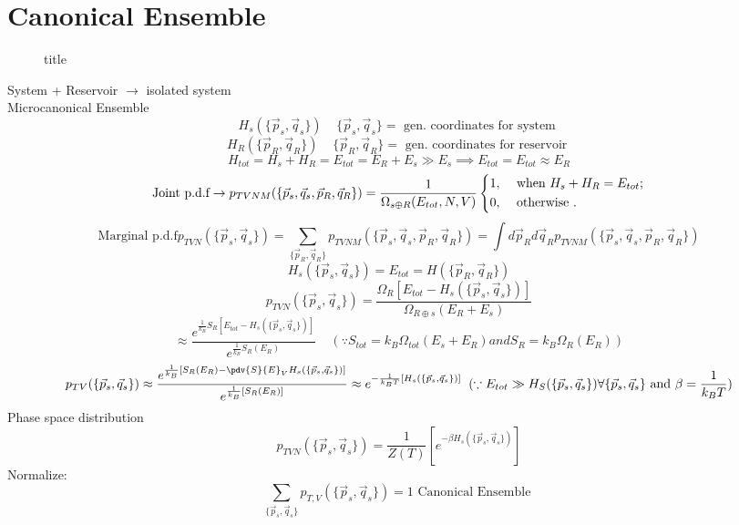 \chapter{Canonical Ensemble}
\begin{figure}[H]
    \centering
    \caption{title}
    \label{fig:system}
\end{figure}
System + Reservoir $\to $ isolated system\\
Microcanonical Ensemble
\[
    H_s (\{\vec{p}_s ,\vec{q}_s\}) \;\;\;\; \{\vec{p}_s ,\vec{q}_s\} = \text{ gen. coordinates for system }
\]
\[
    H_R (\{\vec{p}_R ,\vec{q}_R\}) \;\;\;\; \{\vec{p}_R ,\vec{q}_R\} = \text{ gen. coordinates for reservoir }
\]
\[
    H_{tot}  = H_s + H_R = E_{tot} = E_R + E_s \gg  E_s \implies  E_{tot} = E_{tot} \approx E_R   
\]
\[
   \text{Joint p.d.f} \to  p_{TVNM} (\{\vec{p}_s , \vec{q}_s, \vec{p}_R, \vec{q}_R \}) = \frac{1}{\Omega_{s\oplus R}(E_{tot},N,V )} 
     \begin{dcases}
       1 , &\text{ when } H_s + H_R = E_{tot}   ; \\
        0, &\text{ otherwise }  .
     \end{dcases}
\]
\[
    \text{Marginal p.d.f} p_{TVN} (\{\vec{p}_s,\vec{q}_s\}) = \sum\limits_{\{\vec{p}_R,\vec{q}_R\}}p_{TVNM} (\{\vec{p}_s , \vec{q}_s, \vec{p}_R, \vec{q}_R \}) = \int d\vec{p}_R d\vec{q}_R p_{TVNM} (\{\vec{p}_s , \vec{q}_s, \vec{p}_R, \vec{q}_R \})
\]
\[
    H_s(\{\vec{p}_s,\vec{q}_s\}) = E_{tot} = H(\{\vec{p}_R,\vec{q}_R\}) 
\]
\[
    p_{TVN}(\{\vec{p}_s,\vec{q}_s\})  = \frac{\Omega_R[E_{tot} - H_s(\{\vec{p}_s,\vec{q}_s\}) ]}{\Omega_{R\oplus s}(E_R + E_s)}
\]
\[
     \approx \frac{e^{\frac{1}{k_B}S_R[E_{tot} - H_s(\{\vec{p}_s,\vec{q}_s\}) ]}}{e^{\frac{1}{k_B}S_R(E_R)}} \;\;\;\; (\because S_{tot} = k_B \Omega_{tot}(E_s+ E_R) and S_R = k_B \Omega_R (E_R))
\]
\[
    p_{TV}(\{\vec{p}_s,\vec{q}_s\}) \approx \frac{e^{\frac{1}{k_B}[S_R(E_R)-\pdv{S}{E}_V H_s(\{\vec{p}_s,\vec{q}_s\})]}}{e^{\frac{1}{k_B}[S_R(E_R)]}} \approx e^{-\frac{1}{k_{B}T }[H_s(\{\vec{p}_s,\vec{q}_s\})]} \;\;(\because E_{tot} \gg  H_S(\{\vec{p}_s,\vec{q}_s\}) \forall \{\vec{p}_s,\vec{q}_s\} \text{ and } \beta = \frac{1}{k_B T}) 
\]
Phase space distribution 
\[
    p_{TVN}(\{\vec{p}_s,\vec{q}_s\}) = \frac{1}{Z(T)}[e^{-\beta H_s(\{\vec{p}_s,\vec{q}_s\})}]
\]
Normalize: 
\[
    \sum\limits_{\{\vec{p}_s,\vec{q}_s\}}p_{T,V}(\{\vec{p}_s,\vec{q}_s\})  = 1 \text{ Canonical Ensemble }
\]
